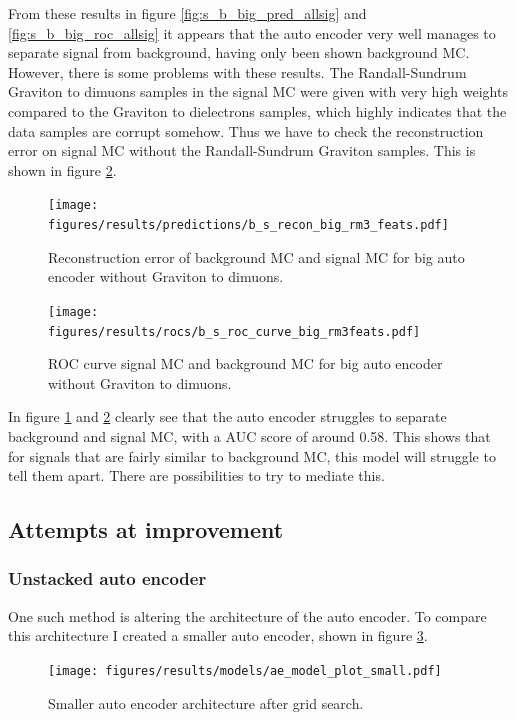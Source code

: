 \documentclass[ reprint, amsmath,amssymb, aps, nofootinbib]{revtex4-2}
\begin{document}
From these results in figure \ref{fig:s_b_big_pred_allsig} and \ref{fig:s_b_big_roc_allsig} it appears that the auto encoder very well manages to separate signal from background, having only been shown background MC. However, there is some problems with these results. The Randall-Sundrum Graviton to dimuons samples in the signal MC were given with very high weights compared to the Graviton to dielectrons samples, which highly indicates that the data samples are corrupt somehow. Thus we have to check the reconstruction error on signal MC without the Randall-Sundrum Graviton samples. This is shown in figure \ref{fig:roc_sig_big_allsig_nogmumu}.


\begin{figure}[H]    
     \centering
    \texttt{[image: figures/results/predictions/b\_s\_recon\_big\_rm3\_feats.pdf]}
    \caption{Reconstruction error of background MC and signal MC for big auto encoder without Graviton to dimuons.  }
    \label{fig:s_b_big_allsig_nogmumu}
\end{figure}

\begin{figure}[H]    
  \centering
         \texttt{[image: figures/results/rocs/b\_s\_roc\_curve\_big\_rm3feats.pdf]}
         \caption{ROC curve signal MC and background MC for big auto encoder without Graviton to dimuons. }
         \label{fig:roc_sig_big_allsig_nogmumu}
\end{figure}


In figure \ref{fig:s_b_big_allsig_nogmumu} and \ref{fig:roc_sig_big_allsig_nogmumu} clearly see that the auto encoder struggles to separate background and signal MC, with a AUC score of around 0.58. This shows that for signals that are fairly similar to background MC, this model will struggle to tell them apart. There are possibilities to try to mediate this. 

\subsection{Attempts at improvement}

\subsubsection{Unstacked auto encoder}
One such method is altering the architecture of the auto encoder. To compare this architecture I created a smaller auto encoder, shown in figure \ref{fig:small_ae_plot}.

\begin{figure}[H]
    \centering
    \texttt{[image: figures/results/models/ae\_model\_plot\_small.pdf]}
    \caption{Smaller auto encoder architecture after grid search. }
    \label{fig:small_ae_plot}
\end{figure}
\end{document}
